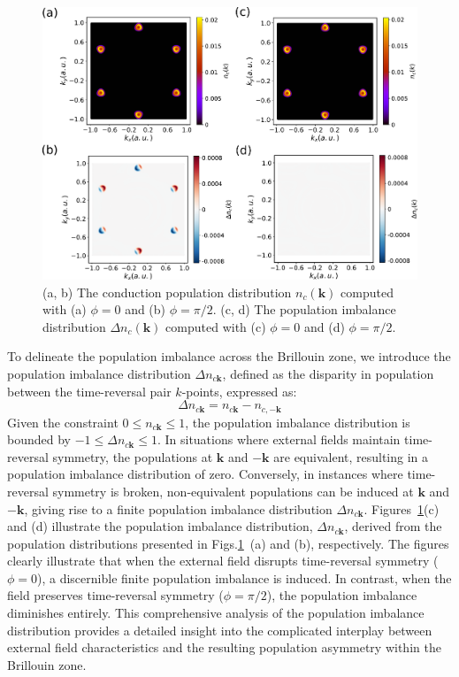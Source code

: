 \begin{figure}[htbp]
\centering
 \includegraphics[width=1.0\linewidth]{pic/population.pdf}
\caption{\label{fig:population} 
(a, b) The conduction population distribution $n_c(\mathbf k)$ computed with (a) $\phi=0$ and (b) $\phi=\pi/2$. (c, d) The population imbalance distribution $\Delta n_c(\mathbf k)$ computed with (c) $\phi=0$ and (d) $\phi=\pi/2$.}
\end{figure}


To delineate the population imbalance across the Brillouin zone, we introduce the population imbalance distribution $\Delta n_{c\mathbf{k}}$, defined as the disparity in population between the time-reversal pair $k$-points, expressed as:
\begin{equation}
 \Delta n_{c\mathbf{k}}=n_{c\mathbf{k}}-n_{c, -\mathbf{k}}  
\label{pop_imbalance }
\end{equation}
Given the constraint $0 \le n_{c\mathbf{k}} \le 1$, the population imbalance distribution is bounded by $-1 \le \Delta n_{c\mathbf{k}} \le 1$. In situations where external fields maintain time-reversal symmetry, the populations at $\mathbf{k}$ and $-\mathbf{k}$ are equivalent, resulting in a population imbalance distribution of zero. Conversely, in instances where time-reversal symmetry is broken, non-equivalent populations can be induced at $\mathbf{k}$ and $-\mathbf{k}$, giving rise to a finite population imbalance distribution $\Delta n_{c\mathbf{k}}$.
Figures~\ref{fig:population}(c) and (d) illustrate the population imbalance distribution, $\Delta n_{c\mathbf{k}}$, derived from the population distributions presented in Figs.\ref{fig:population}~(a) and (b), respectively. The figures clearly illustrate that when the external field disrupts time-reversal symmetry ($\phi=0$), a discernible finite population imbalance is induced. In contrast, when the field preserves time-reversal symmetry ($\phi=\pi/2$), the population imbalance diminishes entirely. This comprehensive analysis of the population imbalance distribution provides a detailed insight into the complicated interplay between external field characteristics and the resulting population asymmetry within the Brillouin zone.


